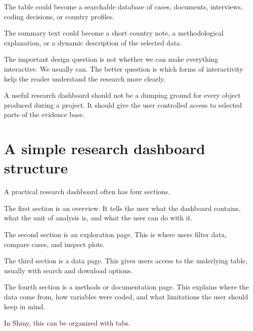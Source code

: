 \documentclass[
  letterpaper,
  DIV=11,
  numbers=noendperiod]{scrreprt}
\begin{document}
The table could become a searchable database of cases, documents,
interviews, coding decisions, or country profiles.

The summary text could become a short country note, a methodological
explanation, or a dynamic description of the selected data.

The important design question is not whether we can make everything
interactive. We usually can. The better question is which forms of
interactivity help the reader understand the research more clearly.

A useful research dashboard should not be a dumping ground for every
object produced during a project. It should give the user controlled
access to selected parts of the evidence base.

\section{A simple research dashboard
structure}\label{a-simple-research-dashboard-structure}

A practical research dashboard often has four sections.

The first section is an overview. It tells the user what the dashboard
contains, what the unit of analysis is, and what the user can do with
it.

The second section is an exploration page. This is where users filter
data, compare cases, and inspect plots.

The third section is a data page. This gives users access to the
underlying table, usually with search and download options.

The fourth section is a methods or documentation page. This explains
where the data come from, how variables were coded, and what limitations
the user should keep in mind.

In Shiny, this can be organized with tabs.
\end{document}

